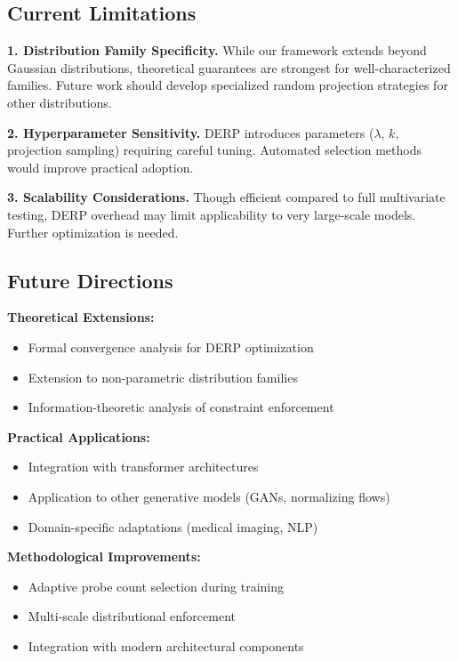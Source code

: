 \documentclass{article}
\begin{document}
\subsection{Current Limitations}

\textbf{1. Distribution Family Specificity.} While our framework extends beyond Gaussian distributions, theoretical guarantees are strongest for well-characterized families. Future work should develop specialized random projection strategies for other distributions.

\textbf{2. Hyperparameter Sensitivity.} DERP introduces parameters ($\lambda$, $k$, projection sampling) requiring careful tuning. Automated selection methods would improve practical adoption.

\textbf{3. Scalability Considerations.} Though efficient compared to full multivariate testing, DERP overhead may limit applicability to very large-scale models. Further optimization is needed.

\subsection{Future Directions}

\textbf{Theoretical Extensions:}
\begin{itemize}
\item Formal convergence analysis for DERP optimization
\item Extension to non-parametric distribution families
\item Information-theoretic analysis of constraint enforcement
\end{itemize}

\textbf{Practical Applications:}
\begin{itemize}
\item Integration with transformer architectures
\item Application to other generative models (GANs, normalizing flows)
\item Domain-specific adaptations (medical imaging, NLP)
\end{itemize}

\textbf{Methodological Improvements:}
\begin{itemize}
\item Adaptive probe count selection during training
\item Multi-scale distributional enforcement
\item Integration with modern architectural components
\end{itemize}
\end{document}
